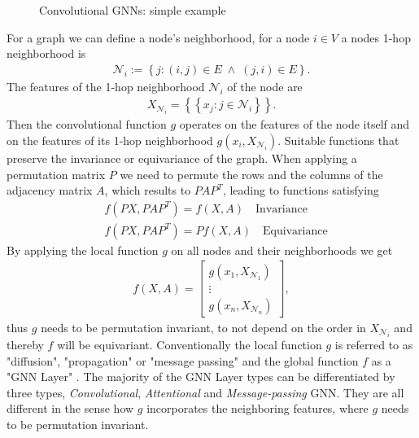 \begin{figure}[htb!]
    \caption{Convolutional GNNs: simple example \label{fig: 4}}
\end{figure}

For a graph we can define a node's neighborhood, for a node $i \in V$ a
nodes 1-hop neighborhood is
\begin{align}
    \mathcal{N}_i := \left\{ j: (i,j) \in E\; \wedge \; (j, i) \in E
    \right\}.
\end{align}
The features of the 1-hop neighborhood $\mathcal{N}_i$ of the node are
\begin{align}
    X_{\mathcal{N}_i} = \left\{ \left\{ x_j: j \in \mathcal{N}_i \right\}
    \right\} .
\end{align}
Then the convolutional function $g$ operates on the features of the node
itself and on the features of its 1-hop neighborhood $g\left(x_i,
X_{\mathcal{N}_i}\right)$. Suitable functions that preserve the invariance
or equivariance of the graph. When applying a permutation matrix $P$ we need
to permute the rows and the columns of the adjacency matrix $A$, which
results to $PAP^{T}$, leading to functions satisfying
\begin{align}
    &f(PX, PAP^{T}) = f(X, A) \quad \text{Invariance}\\
    &f(PX, PAP^{T}) = Pf(X, A) \quad \text{Equivariance}
\end{align}
By applying the local function $g$ on all nodes and their neighborhoods we
get
\begin{align}
    f(X, A) =
    \begin{bmatrix}
        g(x_1, X_{\mathcal{N}_1})\\
        \vdots\\
        g(x_n, X_{\mathcal{N}_n})
    \end{bmatrix},
\end{align}
thus $g$ needs to be permutation invariant, to not depend on the order in
$X_{\mathcal{N}_i}$ and thereby $f$ will be equivariant. Conventionally the
local function $g$ is referred to as "diffusion", "propagation" or "message
passing" and the global function $f$ as a "GNN Layer"
\cite[Chapter~5]{gnn_overview}. The majority of the GNN Layer types can be
differentiated by three types, \textit{Convolutional}, \textit{Attentional}
and \textit{Message-passing} GNN. They are all different in the sense how $g$
incorporates the neighboring features, where $g$ needs to be permutation
invariant.
\newline

